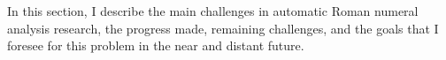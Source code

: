 

In this section, I describe the main challenges in automatic Roman numeral analysis research, the progress made, remaining challenges, and the goals that I foresee for this problem in the near and distant future.
